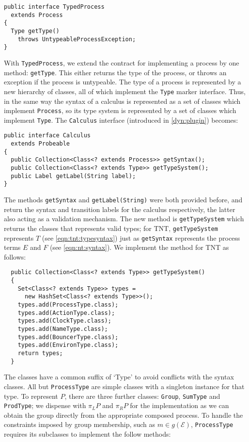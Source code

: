 \begin{verbatim}
public interface TypedProcess
  extends Process
{
  Type getType()
    throws UntypeableProcessException;
}
\end{verbatim}

With \texttt{TypedProcess}, we extend the contract for implementing a
process by one method: \texttt{getType}.  This either returns the type
of the process, or throws an exception if the process is untypeable.
The type of a process is represented by a new hierarchy of classes,
all of which implement the \texttt{Type} marker interface.  Thus, in
the same way the syntax of a calculus is represented as a set of
classes which implement \texttt{Process}, so its type system is
represented by a set of classes which implement \texttt{Type}.  The
\texttt{Calculus} interface (introduced in \ref{dyn:plugin}) becomes:

\begin{verbatim}
public interface Calculus
  extends Probeable
{
  public Collection<Class<? extends Process>> getSyntax();
  public Collection<Class<? extends Type>> getTypeSystem();
  public Label getLabel(String label);
}
\end{verbatim}

The methods \texttt{getSyntax} and \texttt{getLabel(String)} were both
provided before, and return the syntax and transition labels for the
calculus respectively, the latter also acting as a validation
mechanism.  The new method is \texttt{getTypeSystem} which returns the
classes that represents valid types; for TNT, \texttt{getTypeSystem}
represents $T$ (see \ref{eqn:tnt:typesyntax}) just as
\texttt{getSyntax} represents the process terms $E$ and $F$ (see
\ref{eqn:nt:syntax}).  We implement the method for TNT as follows:

\begin{verbatim}
  public Collection<Class<? extends Type>> getTypeSystem()
  {
    Set<Class<? extends Type>> types =
      new HashSet<Class<? extends Type>>();
    types.add(ProcessType.class);
    types.add(ActionType.class);
    types.add(ClockType.class);
    types.add(NameType.class);
    types.add(BouncerType.class);
    types.add(EnvironType.class);
    return types;
  }
\end{verbatim}

The classes have a common suffix of `Type' to avoid conflicts with the
syntax classes.  All but \texttt{ProcessType} are simple classes with
a singleton instance for that type.  To represent $P$, there are three
further classes: \texttt{Group}, \texttt{SumType} and
\texttt{ProdType}; we dispense with $\pi_L P$ and $\pi_R P$ for the
implementation as we can obtain the group directly from the
appropriate composed process.  To handle the constraints imposed by
group membership, such as $m \in g(\mathscr{E})$, \texttt{ProcessType}
requires its subclasses to implement the follow methods:

